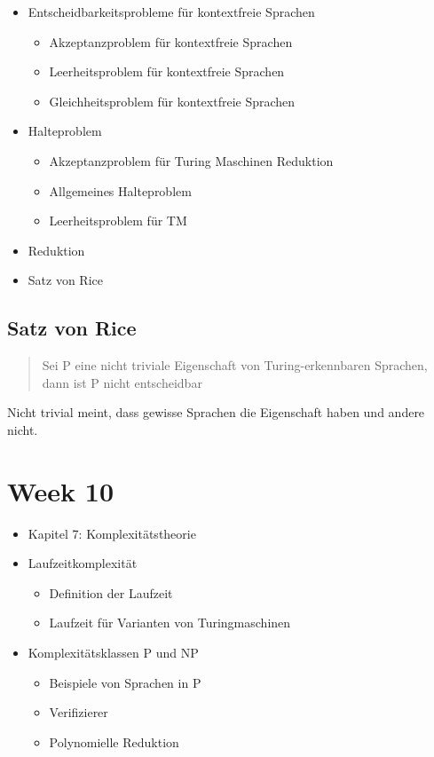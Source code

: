 \documentclass[11pt,twoside,landscape]{article}
\begin{document}
\begin{multicols}{3}
\begin{itemize}
\item Entscheidbarkeitsprobleme für kontextfreie Sprachen
\begin{itemize}
\item Akzeptanzproblem für kontextfreie Sprachen
\item Leerheitsproblem für kontextfreie Sprachen
\item Gleichheitsproblem für kontextfreie Sprachen
\end{itemize}

\item Halteproblem
\begin{itemize}
\item Akzeptanzproblem für Turing Maschinen Reduktion
\item Allgemeines Halteproblem
\item Leerheitsproblem für TM
\end{itemize}
\item Reduktion
\item Satz von Rice
\end{itemize}


\subsection*{Satz von Rice}
\label{sec:org81c8ad4}
\begin{quote}
Sei P eine nicht triviale Eigenschaft von Turing-erkennbaren Sprachen, dann
ist P nicht entscheidbar
\end{quote}
Nicht trivial meint, dass gewisse Sprachen die Eigenschaft haben und andere nicht.

\section*{Week 10}
\label{sec:org67dc312}
\begin{itemize}
\item Kapitel 7: Komplexitätstheorie
\item Laufzeitkomplexität
\begin{itemize}
\item Definition der Laufzeit
\item Laufzeit für Varianten von Turingmaschinen
\end{itemize}

\item Komplexitätsklassen P und NP
\begin{itemize}
\item Beispiele von Sprachen in P
\item Verifizierer
\item Polynomielle Reduktion
\end{itemize}
\end{itemize}

\end{multicols}
\end{document}
